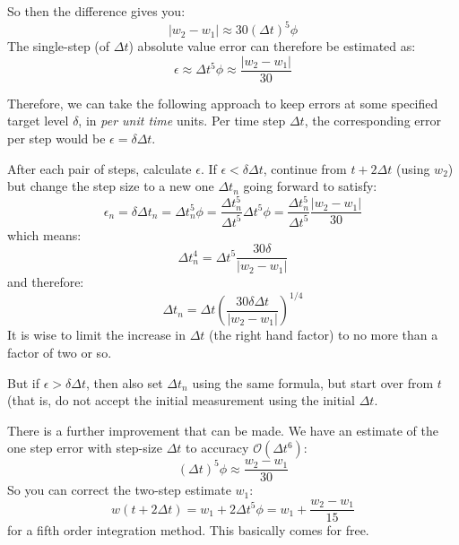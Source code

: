 So then the difference gives you:
\begin{equation}
  \left|w_2 - w_1\right| \approx 30 (\Delta t)^5 \phi
\end{equation}
The single-step (of $\Delta t$) absolute value error can therefore be
estimated as:
\begin{equation}
\epsilon \approx \Delta t^5 \phi \approx \frac{\left|w_2 -
  w_1\right|}{30}
\end{equation}

Therefore, we can take the following approach to keep errors at some
specified target level $\delta$, in {\it per unit time} units. Per
time step $\Delta t$, the corresponding error per step would be
$\epsilon = \delta\Delta t$.

After each pair of steps, calculate $\epsilon$. If $\epsilon < \delta \Delta
t $, continue from $t+ 2\Delta t$ (using $w_2$) but change the
step size to a new one $\Delta t_n$ going forward to satisfy:
\begin{equation}
  \epsilon_n = \delta \Delta t_n = \Delta t_n^5 \phi
  = \frac{\Delta t_n^5}{\Delta t^5} \Delta t^5 \phi
  = \frac{\Delta t_n^5}{\Delta t^5} \frac{\left|w_2 - w_1\right|}{30}
\end{equation}
which means:
\begin{equation}
\Delta t_n^4 = \Delta t^5 \frac{30 \delta}{\left|w_2 - w_1\right|}
\end{equation}
and therefore:
\begin{equation}
\Delta t_n = \Delta t \left(\frac{30 \delta \Delta t}{\left|w_2 -
  w_1\right|}\right)^{1/4}
\end{equation}
It is wise to limit the increase in $\Delta t$ (the right hand factor)
to no more than a factor of two or so.

But if $\epsilon > \delta \Delta t $, then also set $\Delta t_n$
using the same formula, but start over from $t$ (that is, do not
accept the initial measurement using the initial $\Delta t$.

There is a further improvement that can be made. We have an estimate
of the one step error with step-size $\Delta t$ to accuracy
$\mathcal{O}(\Delta t^6)$:
\begin{equation}
  (\Delta t)^5 \phi \approx \frac{w_2 - w_1}{30}
\end{equation}
So you can correct the two-step estimate $w_1$:
\begin{equation}
w(t+ 2\Delta t) = w_1 + 2 \Delta t^5 \phi = w_1 + 
  \frac{w_2 - w_1}{15}
\end{equation}
for a fifth order integration method. This basically comes for free. 

